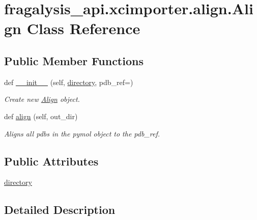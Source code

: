 \hypertarget{classfragalysis__api_1_1xcimporter_1_1align_1_1_align}{}\section{fragalysis\+\_\+api.\+xcimporter.\+align.\+Align Class Reference}
\label{classfragalysis__api_1_1xcimporter_1_1align_1_1_align}
\subsection*{Public Member Functions}
\begin{DoxyCompactItemize}
\item 
def \hyperlink{classfragalysis__api_1_1xcimporter_1_1align_1_1_align_a28e5edc1a05680d36665012eff20a271}{\+\_\+\+\_\+init\+\_\+\+\_\+} (self, \hyperlink{classfragalysis__api_1_1xcimporter_1_1align_1_1_align_aaa8ff46caee489ab4cab5279ac946bcc}{directory}, pdb\+\_\+ref=\textquotesingle{}\textquotesingle{})
\begin{DoxyCompactList}\small\item\em Create new \hyperlink{classfragalysis__api_1_1xcimporter_1_1align_1_1_align}{Align} object. \end{DoxyCompactList}\item 
def \hyperlink{classfragalysis__api_1_1xcimporter_1_1align_1_1_align_a554c8cc5acbc9f5e86bb668c49ea1254}{align} (self, out\+\_\+dir)
\begin{DoxyCompactList}\small\item\em Aligns all pdbs in the pymol object to the pdb\+\_\+ref. \end{DoxyCompactList}\end{DoxyCompactItemize}
\subsection*{Public Attributes}
\begin{DoxyCompactItemize}
\item 
\hyperlink{classfragalysis__api_1_1xcimporter_1_1align_1_1_align_aaa8ff46caee489ab4cab5279ac946bcc}{directory}
\end{DoxyCompactItemize}


\subsection{Detailed Description}


